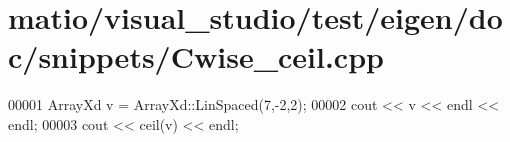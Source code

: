 \hypertarget{matio_2visual__studio_2test_2eigen_2doc_2snippets_2_cwise__ceil_8cpp_source}{}\section{matio/visual\+\_\+studio/test/eigen/doc/snippets/\+Cwise\+\_\+ceil.cpp}
\label{matio_2visual__studio_2test_2eigen_2doc_2snippets_2_cwise__ceil_8cpp_source}

\begin{DoxyCode}
00001 ArrayXd v = ArrayXd::LinSpaced(7,-2,2);
00002 cout << v << endl << endl;
00003 cout << ceil(v) << endl;
\end{DoxyCode}

